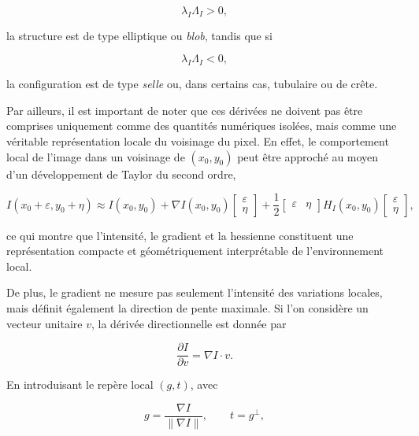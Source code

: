 \begin{equation}
\lambda_I\Lambda_I>0,
\label{eq:elliptic_condition}
\end{equation}

la structure est de type elliptique ou \textit{blob}, tandis que si

\begin{equation}
\lambda_I\Lambda_I<0,
\label{eq:saddle_condition}
\end{equation}

la configuration est de type \textit{selle} ou, dans certains cas, tubulaire ou de crête.

Par ailleurs, il est important de noter que ces dérivées ne doivent pas être comprises uniquement comme des quantités numériques isolées, mais comme une véritable représentation locale du voisinage du pixel. En effet, le comportement local de l’image dans un voisinage de \((x_0,y_0)\) peut être approché au moyen d’un développement de Taylor du second ordre,

\begin{equation}
I(x_0+\varepsilon,y_0+\eta)
\approx
I(x_0,y_0)
+
\nabla I(x_0,y_0)
\begin{bmatrix}
\varepsilon\\
\eta
\end{bmatrix}
+
\frac{1}{2}
\begin{bmatrix}
\varepsilon & \eta
\end{bmatrix}
H_I(x_0,y_0)
\begin{bmatrix}
\varepsilon\\
\eta
\end{bmatrix},
\label{eq:taylor_second_order}
\end{equation}

ce qui montre que l’intensité, le gradient et la hessienne constituent une représentation compacte et géométriquement interprétable de l’environnement local.

De plus, le gradient ne mesure pas seulement l’intensité des variations locales, mais définit également la direction de pente maximale. Si l’on considère un vecteur unitaire \(v\), la dérivée directionnelle est donnée par

\begin{equation}
\frac{\partial I}{\partial v}=\nabla I\cdot v.
\label{eq:directional_derivative}
\end{equation}

En introduisant le repère local \((g,t)\), avec

\begin{equation}
g=\frac{\nabla I}{\|\nabla I\|},
\qquad
t=g^{\perp},
\label{eq:local_frame}
\end{equation}

